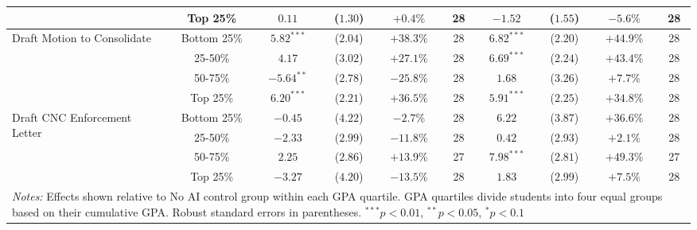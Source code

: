 \begin{table}[!htbp]
\begin{tabular}{lccccccccc}
& Top 25\% & $0.11$ & ($1.30$) & $+0.4\%$ & 28 & $-1.52$ & ($1.55$) & $-5.6\%$ & 28 \\
\hline
\multirow{4}{*}{Draft Motion to Consolidate} & Bottom 25\% & $5.82^{***}$ & ($2.04$) & $+38.3\%$ & 28 & $6.82^{***}$ & ($2.20$) & $+44.9\%$ & 28 \\
& 25-50\% & $4.17$ & ($3.02$) & $+27.1\%$ & 28 & $6.69^{***}$ & ($2.24$) & $+43.4\%$ & 28 \\
& 50-75\% & $-5.64^{**}$ & ($2.78$) & $-25.8\%$ & 28 & $1.68$ & ($3.26$) & $+7.7\%$ & 28 \\
& Top 25\% & $6.20^{***}$ & ($2.21$) & $+36.5\%$ & 28 & $5.91^{***}$ & ($2.25$) & $+34.8\%$ & 28 \\
\hline
\multirow{4}{*}{Draft CNC Enforcement Letter} & Bottom 25\% & $-0.45$ & ($4.22$) & $-2.7\%$ & 28 & $6.22$ & ($3.87$) & $+36.6\%$ & 28 \\
& 25-50\% & $-2.33$ & ($2.99$) & $-11.8\%$ & 28 & $0.42$ & ($2.93$) & $+2.1\%$ & 28 \\
& 50-75\% & $2.25$ & ($2.86$) & $+13.9\%$ & 27 & $7.98^{***}$ & ($2.81$) & $+49.3\%$ & 27 \\
& Top 25\% & $-3.27$ & ($4.20$) & $-13.5\%$ & 28 & $1.83$ & ($2.99$) & $+7.5\%$ & 28 \\
\hline
\multicolumn{10}{p{0.95\linewidth}}{\footnotesize \textit{Notes:} Effects shown relative to No AI control group within each GPA quartile. GPA quartiles divide students into four equal groups based on their cumulative GPA. Robust standard errors in parentheses. $^{***}p<0.01$, $^{**}p<0.05$, $^{*}p<0.1$}
\end{tabular}
\end{table}
